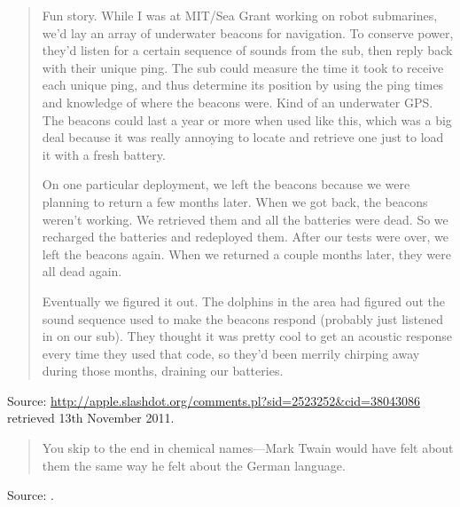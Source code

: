 \documentclass[a4paper]{article}
\begin{document}
\begin{quotation}
Fun story. While I was at MIT/Sea Grant working on robot submarines, we'd lay an array of
underwater beacons for navigation. To conserve power, they'd listen for a certain sequence of
sounds from the sub, then reply back with their unique ping. The sub could measure the time it took
to receive each unique ping, and thus determine its position by using the ping times and knowledge
of where the beacons were. Kind of an underwater GPS. The beacons could last a year or more when
used like this, which was a big deal because it was really annoying to locate and retrieve one just
to load it with a fresh battery.

On one particular deployment, we left the beacons because we were planning to return a few months
later. When we got back, the beacons weren't working. We retrieved them and all the batteries were
dead. So we recharged the batteries and redeployed them. After our tests were over, we left the
beacons again. When we returned a couple months later, they were all dead again.

Eventually we figured it out. The dolphins in the area had figured out the sound sequence used to
make the beacons respond (probably just listened in on our sub). They thought it was pretty cool to
get an acoustic response every time they used that code, so they'd been merrily chirping away
during those months, draining our batteries.
\end{quotation}
Source: \url{http://apple.slashdot.org/comments.pl?sid=2523252&cid=38043086} retrieved 13th
November 2011.
\medskip

\begin{quote}
	You skip to the end in chemical names---Mark Twain would have felt about them the same way he
felt about the German language.
\end{quote}
Source: \citet{Lowe2011}.
\medskip
\end{document}
